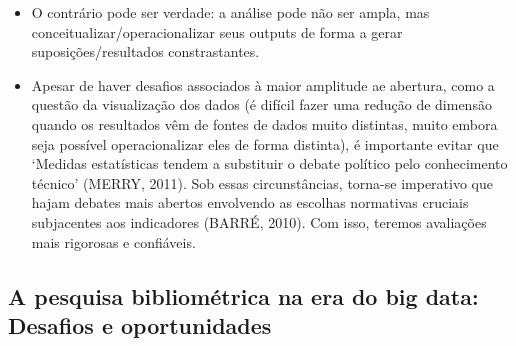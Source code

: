 \documentclass[11pt]{article}
\begin{document}
\begin{itemize}
\item O contrário pode ser verdade: a análise pode não ser ampla, mas conceitualizar/operacionalizar seus outputs de forma a gerar suposições/resultados constrastantes.

\item Apesar de haver desafios associados à maior amplitude ae abertura, como a questão da visualização dos dados (é difícil fazer uma redução de dimensão quando os resultados vêm de fontes de dados muito distintas, muito embora seja possível operacionalizar eles de forma distinta), é importante evitar que ‘Medidas estatísticas tendem a substituir o debate político pelo conhecimento técnico’ (MERRY, 2011). Sob essas circunstâncias, torna-se imperativo que hajam debates mais abertos envolvendo as escolhas normativas cruciais subjacentes aos indicadores (BARRÉ, 2010). Com isso, teremos avaliações mais rigorosas e confiáveis.
\end{itemize}

\subsection{A pesquisa bibliométrica na era do big data: Desafios e oportunidades}
\label{sec:org6a6cf9b}
\end{document}

